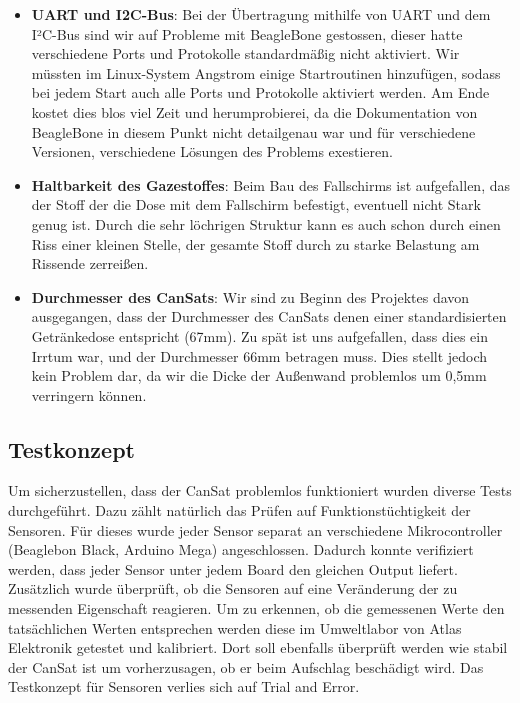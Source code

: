 \begin{itemize}
	\item \textbf{UART und I2C-Bus}: Bei der Übertragung mithilfe von UART und dem I²C-Bus sind wir auf Probleme mit BeagleBone gestossen, dieser hatte verschiedene Ports und Protokolle standardmäßig nicht aktiviert. Wir müssten im Linux-System Angstrom einige Startroutinen hinzufügen, sodass bei jedem Start auch alle Ports und Protokolle aktiviert werden. Am Ende kostet dies blos viel Zeit und herumprobierei, da die Dokumentation von BeagleBone in diesem Punkt nicht detailgenau war und für verschiedene Versionen, verschiedene Lösungen des Problems exestieren.
\item \textbf{Haltbarkeit des Gazestoffes}: Beim Bau des Fallschirms ist aufgefallen, das der Stoff der die Dose mit dem Fallschirm befestigt, eventuell nicht Stark genug ist. Durch die sehr löchrigen Struktur kann es auch schon durch einen Riss einer kleinen Stelle, der gesamte Stoff durch zu starke Belastung am Rissende zerreißen.
\item \textbf{Durchmesser des CanSats}: Wir sind zu Beginn des Projektes davon ausgegangen, dass der Durchmesser des CanSats denen einer standardisierten Getränkedose entspricht (67mm). Zu spät ist uns aufgefallen, dass dies ein Irrtum war, und der Durchmesser 66mm betragen muss. Dies stellt jedoch kein Problem dar, da wir die Dicke der Außenwand problemlos um 0,5mm verringern können.
\end{itemize}

\subsection{Testkonzept}

Um sicherzustellen, dass der CanSat problemlos funktioniert wurden diverse Tests durchgeführt. Dazu zählt natürlich das Prüfen auf Funktionstüchtigkeit der Sensoren. Für dieses wurde jeder Sensor separat an verschiedene Mikrocontroller (Beaglebon Black, Arduino Mega) angeschlossen. Dadurch konnte verifiziert werden, dass jeder Sensor unter jedem Board den gleichen Output liefert. Zusätzlich wurde überprüft, ob die Sensoren auf eine Veränderung der zu messenden Eigenschaft reagieren. Um zu erkennen, ob die gemessenen Werte den tatsächlichen Werten entsprechen werden diese im Umweltlabor von Atlas Elektronik getestet und kalibriert. Dort soll ebenfalls überprüft werden wie stabil der CanSat ist um vorherzusagen, ob er beim Aufschlag beschädigt wird. Das Testkonzept für Sensoren verlies sich auf Trial and Error.